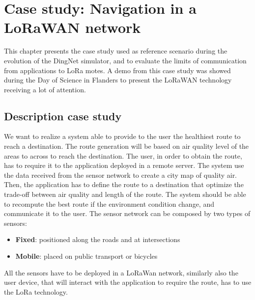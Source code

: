 \chapter{Case study: Navigation in a LoRaWAN network}
\label{chap:case-staudyLoRa}

This chapter presents the case study used as reference scenario during the evolution of the DingNet simulator, and to evaluate the limits of communication from applications to LoRa motes. 
A demo from this case study was showed during the Day of Science in Flanders to present the LoRaWAN technology receiving a lot of attention.

\section{Description case study}

We want to realize a system able to provide to the user the healthiest route to reach a destination. 
The route generation will be based on air quality level of the areas to across to reach the destination. 
The user, in order to obtain the route, has to require it to the application deployed in a remote server.
The system use the data received from the sensor network to create a city map of quality air.
Then, the application has to define the route to a destination that optimize the trade-off between air quality and length of the route.
The system should be able to recompute the best route if the environment condition change, and communicate it to the user.
The sensor network can be composed by two types of sensors:
\begin{itemize}
    \item \textbf{Fixed}: positioned along the roads and at intersections
    \item \textbf{Mobile}: placed on public transport or bicycles
\end{itemize}
All the sensors have to be deployed in a LoRaWan network, similarly also the user device, that will interact with the application to require the route, has to use the LoRa technology.


